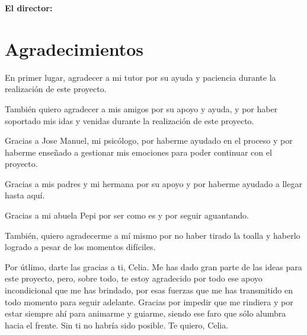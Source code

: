 \vspace{1cm}

\textbf{El director: }

\vspace{5cm}

\noindent \textbf{\tutor}

\chapter*{Agradecimientos}

{ \setlength{\parskip}{7mm} %
En primer lugar, agradecer a mi tutor \tutor{} por su ayuda y paciencia durante la realización
de este proyecto.

También quiero agradecer a mis amigos por su apoyo y ayuda, y por haber soportado mis
idas y venidas durante la realización de este proyecto.

Gracias a Jose Manuel, mi psicólogo, por haberme ayudado en el proceso y por haberme
enseñado a gestionar mis emociones para poder continuar con el proyecto.

Gracias a mis padres y mi hermana por su apoyo y por haberme ayudado a llegar hasta aquí.

Gracias a mi abuela Pepi por ser como es y por seguir aguantando.

También, quiero agradecerme a mí mismo por no haber tirado la toalla y haberlo logrado a
pesar de los momentos difíciles.

Por útlimo, darte las gracias a ti, Celia. Me has dado gran parte de las ideas para este
proyecto, pero, sobre todo, te estoy agradecido por todo ese apoyo incondicional que me has
brindado, por esas fuerzas que me has transmitido en todo momento para seguir adelante.
Gracias por impedir que me rindiera y por estar siempre ahí para animarme y guiarme, siendo
ese faro que sólo alumbra hacia el frente. Sin ti no habría sido posible. Te quiero, Celia.
}